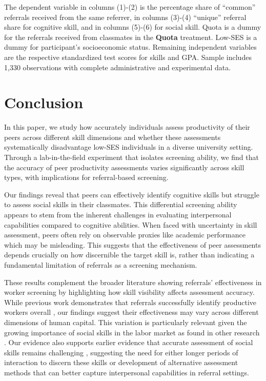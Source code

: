 \documentclass[11pt,a4paper,oneside]{article}
\begin{document}
\begin{table}[H]
\begin{threeparttable}
\begin{tablenotes}[flushleft]
    The dependent variable in columns (1)-(2) is the percentage share of ``common'' referrals received from the same referrer, in columns (3)-(4) ``unique'' referral share for cognitive skill, and in columns (5)-(6) for social skill. Quota is a dummy for the referrals received from classmates in the \textbf{Quota} treatment. Low-SES is a dummy for participant's socioeconomic status. Remaining independent variables are the respective standardized test scores for skills and GPA. Sample includes 1,330 observations with complete administrative and experimental data.
    \end{tablenotes}
    \end{threeparttable}
  \end{table}

  \section{Conclusion} \label{s6}
  In this paper, we study how accurately individuals assess productivity of their peers across different skill dimensions and whether these assessments systematically disadvantage low-SES individuals in a diverse university setting. Through a lab-in-the-field experiment that isolates screening ability, we find that the accuracy of peer productivity assessments varies significantly across skill types, with implications for referral-based screening.

  Our findings reveal that peers can effectively identify cognitive skills but struggle to assess social skills in their classmates. This differential screening ability appears to stem from the inherent challenges in evaluating interpersonal capabilities compared to cognitive abilities. When faced with uncertainty in skill assessment, peers often rely on observable proxies like academic performance which may be misleading. This suggests that the effectiveness of peer assessments depends crucially on how discernible the target skill is, rather than indicating a fundamental limitation of referrals as a screening mechanism.

  These results complement the broader literature showing referrals' effectiveness in worker screening by highlighting how skill visibility affects assessment accuracy. While previous work demonstrates that referrals successfully identify productive workers overall \citep{pallais_why_2016}, our findings suggest their effectiveness may vary across different dimensions of human capital. This variation is particularly relevant given the growing importance of social skills in the labor market as found in other research \citep{deming2017growing}. Our evidence also supports earlier evidence that accurate assessment of social skills remains challenging \citep{bassi2022screening}, suggesting the need for either longer periods of interaction to discern these skills or development of alternative assessment methods that can better capture interpersonal capabilities in referral settings.
\end{document}
